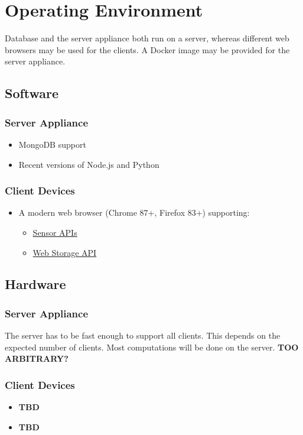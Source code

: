 \section{Operating Environment}
Database and the server appliance both run on a server, whereas different web browsers may be used for the clients. A Docker image may be provided for the server appliance.

\subsection{Software}
\subsubsection{Server Appliance}
\begin{itemize}
    \item MongoDB support
    \item Recent versions of Node.js and Python 
\end{itemize}
\subsubsection{Client Devices}
\begin{itemize}
    \item A modern web browser (Chrome 87+, Firefox 83+) supporting: %
    \begin{itemize}
        \item \href{https://developer.mozilla.org/en-US/docs/Web/API/Sensor_APIs}{Sensor APIs}
        \item \href{https://developer.mozilla.org/en-US/docs/Web/API/Web_Storage_API}{Web Storage API}
    \end{itemize}
\end{itemize}

\subsection{Hardware} %
\subsubsection{Server Appliance}
    The server has to be fast enough to support all clients. This depends on the expected number of clients. Most computations will be done on the server. \textbf{TOO ARBITRARY?}
\subsubsection{Client Devices}
\begin{itemize}
    \item \textbf{TBD}
    \item \textbf{TBD}
\end{itemize}
